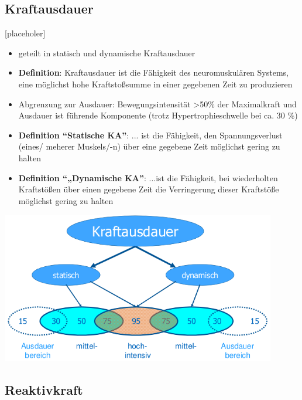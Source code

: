 \subsection{Kraftausdauer}

[placeholer]

\begin{itemize}
    \item geteilt in statisch und dynamische Kraftausdauer
    \item \textbf{Definition}: Kraftausdauer ist die Fähigkeit des neuromuskulären Systems, eine möglichst hohe Kraftstoßsumme in einer gegebenen Zeit zu produzieren
    \item Abgrenzung zur Ausdauer: Bewegungsintensität >50\% der Maximalkraft und Ausdauer ist führende Komponente (trotz Hypertrophieschwelle bei ca. 30 \%)
    \item \textbf{Definition ``Statische KA''}: ... ist die Fähigkeit, den Spannungsverlust (eines/ meherer Muskels/-n) über eine gegebene Zeit möglichst gering zu halten
    \item \textbf{Definition ``„Dynamische KA''}: ...ist die Fähigkeit, bei wiederholten Kraftstößen über einen gegebene Zeit die Verringerung dieser Kraftstöße möglichst gering zu halten
\end{itemize}

 \includegraphics[width=0.90\textwidth]{pictures/kraftausdauer}

 \subsection{Reaktivkraft}

